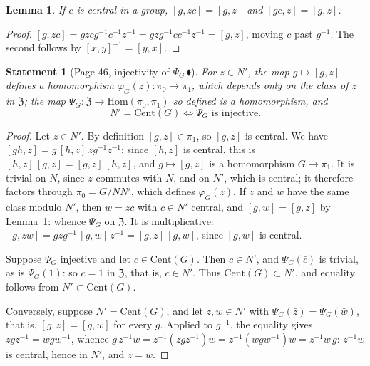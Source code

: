 \documentclass[11pt]{article}
\newcommand{\piste}[1]{\,\href{https://grothendieck.commutator.io/findings/\##1}{\textcolor{piste}{\ensuremath{\blacklozenge}}}}
\theoremstyle{plain}
\newtheorem*{enonce}{Statement}
\newtheorem{lemme}{Lemma}[section]
\theoremstyle{definition}
\theoremstyle{remark}
\begin{document}
\begin{lemme}\label{lem:133-central}
If $c$ is central in a group, $[g, zc] = [g, z]$ and $[gc, z] = [g, z]$.
\end{lemme}

\begin{proof}
$[g, zc] = gzcg^{-1}c^{-1}z^{-1} = gzg^{-1}cc^{-1}z^{-1} = [g, z]$, moving $c$ past $g^{-1}$. The second follows by $[x, y]^{-1} = [y, x]$.
\end{proof}

\begin{enonce}[Page 46, injectivity of $\Psi_G$\piste{133-centre-and-derived-group-from-two-crossed-modules}]
For $z \in \overline{N'}$, the map $g \mapsto [g, z]$ defines a homomorphism $\varphi_G(z) : \pi_0 \to \pi_1$, which depends only on the class of $z$ in $\mathfrak Z$; the map $\Psi_G : \mathfrak Z \to \mathrm{Hom}(\pi_0, \pi_1)$ so defined is a homomorphism, and
\[
N' = \mathrm{Cent}(G) \iff \Psi_G \text{ is injective.}
\]
\end{enonce}

\begin{proof}
Let $z \in \overline{N'}$. By definition $[g, z] \in \pi_1$, so $[g, z]$ is central. We have $[gh, z] = g\,[h, z]\,zg^{-1}z^{-1}$; since $[h, z]$ is central, this is $[h, z]\,[g, z] = [g, z]\,[h, z]$, and $g \mapsto [g, z]$ is a homomorphism $G \to \pi_1$. It is trivial on $N$, since $z$ commutes with $N$, and on $N'$, which is central; it therefore factors through $\pi_0 = G/NN'$, which defines $\varphi_G(z)$. If $z$ and $w$ have the same class modulo $N'$, then $w = zc$ with $c \in N'$ central, and $[g, w] = [g, z]$ by Lemma~\ref{lem:133-central}: whence $\Psi_G$ on $\mathfrak Z$. It is multiplicative: $[g, zw] = gzg^{-1}\,[g, w]\,z^{-1} = [g, z]\,[g, w]$, since $[g, w]$ is central.

Suppose $\Psi_G$ injective and let $c \in \mathrm{Cent}(G)$. Then $c \in \overline{N'}$, and $\Psi_G(\bar c)$ is trivial, as is $\Psi_G(1)$: so $\bar c = 1$ in $\mathfrak Z$, that is, $c \in N'$. Thus $\mathrm{Cent}(G) \subset N'$, and equality follows from $N' \subset \mathrm{Cent}(G)$.

Conversely, suppose $N' = \mathrm{Cent}(G)$, and let $z, w \in \overline{N'}$ with $\Psi_G(\bar z) = \Psi_G(\bar w)$, that is, $[g, z] = [g, w]$ for every $g$. Applied to $g^{-1}$, the equality gives $zgz^{-1} = wgw^{-1}$, whence $g\,z^{-1}w = z^{-1}(zgz^{-1})w = z^{-1}(wgw^{-1})w = z^{-1}w\,g$: $z^{-1}w$ is central, hence in $N'$, and $\bar z = \bar w$.
\end{proof}
\end{document}

